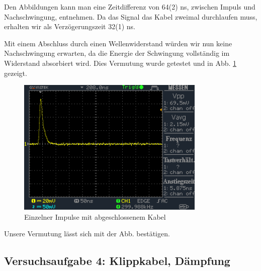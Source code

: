 \documentclass[a4paper,10pt]{article}
\numberwithin{equation}{section}
\begin{document}
Den Abbildungen kann man eine Zeitdifferenz von 64(2) ns, zwischen Impuls und Nachschwingung, entnehmen. Da das Signal das Kabel zweimal durchlaufen muss, erhalten wir als Verzögerungszeit 32(1) ns.

Mit einem Abschluss durch einen Wellenwiderstand würden wir nun keine Nachschwingung erwarten, da die Energie der Schwingung vollständig im Widerstand absorbiert wird. Dies Vermutung wurde getestet und in Abb. \ref{fig:3.10} gezeigt.
\begin{figure}[h]
        \centering
        \includegraphics[width=0.8\textwidth]{data/DS0026.BMP.png}
        \caption{Einzelner Impulse mit abgeschlossenem Kabel}
		\label{fig:3.10}
\end{figure}
Unsere Vermutung lässt sich mit der Abb. bestätigen.

\subsection{Versuchsaufgabe 4: Klippkabel, Dämpfung}



\clearpage
\listoffigures
\listoftables



\end{document}
